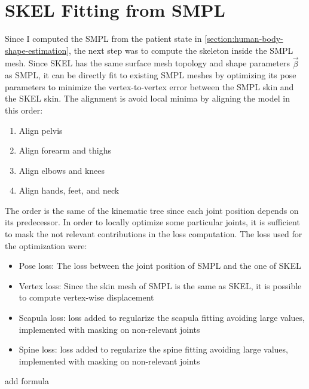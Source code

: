\section{SKEL Fitting from SMPL}
Since I computed the SMPL from the patient state in \autoref{section:human-body-shape-estimation}, the next step was to compute the skeleton inside the SMPL mesh. Since SKEL has the same surface mesh topology and shape parameters $\vec{\beta}$ as SMPL, it can be directly fit to existing SMPL meshes by optimizing its pose parameters to minimize the vertex-to-vertex
error between the SMPL skin and the SKEL skin. The alignment is avoid local minima by aligning the model in this order:
\begin{enumerate}
\item Align pelvis
\item Align forearm and thighs
\item Align elbows and knees 
\item Align hands, feet, and neck
\end{enumerate}
The order is the same of the kinematic tree since each joint position depends on its predecessor. In order to locally optimize some particular joints, it is sufficient to mask the not relevant contributions in the loss computation. The loss used for the optimization were:
\begin{itemize}
    \item Pose loss: The loss between the joint position of SMPL and the one of SKEL
    \item Vertex loss: Since the skin mesh of SMPL is the same as SKEL, it is possible to compute vertex-wise displacement
    \item Scapula loss: loss added to regularize the scapula fitting avoiding large values, implemented with masking on non-relevant joints
    \item Spine loss: loss added to regularize the spine fitting avoiding large values, implemented with masking on non-relevant joints
\end{itemize}
\TODO add formula
